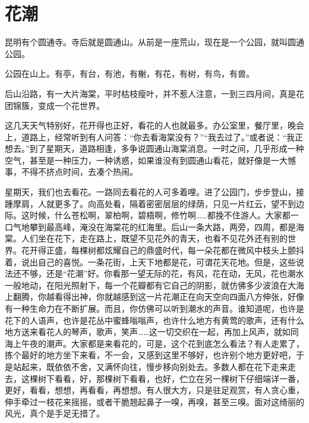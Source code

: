 \documentclass[12pt,UTF-8,openany]{ctexbook}
\begin{document}
\chapter{花潮}

\begin{Large}
    
    昆明有个圆通寺。寺后就是圆通山。从前是一座荒山，现在是一个公园，就叫圆通公园。
    
    公园在山上。有亭，有台，有池，有榭，有花，有树，有鸟，有兽。
    
    后山沿路，有一大片海棠，平时枯枝瘦叶，并不惹人注意，一到三四月间，真是花团锦簇，变成一个花世界。
    
    这几天天气特别好，花开得也正好，看花的人也就最多。办公室里，餐厅里，晚会上，道路上，经常听到有人问答：“你去看海棠没有？”“我去过了。”或者说：“我正想去。”到了星期天，道路相逢，多争说圆通山海棠消息。一时之间，几乎形成一种空气，甚至是一种压力，一种诱惑，如果谁没有到圆通山看花，就好像是一大憾事，不得不挤点时间，去凑个热闹。
    
    星期天，我们也去看花。一路同去看花的人可多着哩。进了公园门，步步登山，接踵摩肩，人就更多了。向高处看，隔着密密层层的绿荫，只见一片红云，望不到边际。这时候，什么苍松啊，翠柏啊，碧梧啊，修竹啊……都挽不住游人。大家都一口气地攀到最高峰，淹没在海棠花的红海里。后山一条大路，两旁，四周，都是海棠。人们坐在花下，走在路上，既望不见花外的青天，也看不见花外还有别的世界。花开得正盛，每棵树都炫耀自己的鼎盛时代，每一朵花都在微风中枝头上颤抖着，说出自己的喜悦。一条花街，上天下地都是花，可谓花天花地。但是，这些说法还不够，还是“花潮”好。你看那一望无际的花，有风，花在动，无风，花也潮水一般地动，在阳光照射下，每一个花瓣都有它自己的阴影，就仿佛多少波浪在大海上翻腾，你越看得出神，你就越感到这一片花潮正在向天空向四面八方伸张，好像有一种生命力在不断扩展。而且，你仿佛可以听到潮水的声音。谁知道呢，也许是花下的人语声，也许是花丛中蜜蜂嗡嗡声，也许什么地方有黄莺的歌声，还有什么地方送来看花人的琴声，歌声，笑声……这一切交织在一起，再加上风声，就如同海上午夜的潮声。大家都是来看花的，可是，这个花到底怎么看法？有人走累了，拣个最好的地方坐下来看，不一会，又感到这里不够好，也许别个地方更好吧，于是站起来，既依依不舍，又满怀向往，慢步移向别处去。多数人都在花下走来走去，这棵树下看看，好，那棵树下看看，也好，伫立在另一棵树下仔细端详一番，更好，看看，想想，再看看，再想想。有人很大方，只是驻足观赏，有人贪心重，伸手牵过一枝花来摇摇，或者干脆翘起鼻子一嗅，再嗅，甚至三嗅。面对这绮丽的风光，真个是手足无措了。
    

\end{Large}
\end{document}
